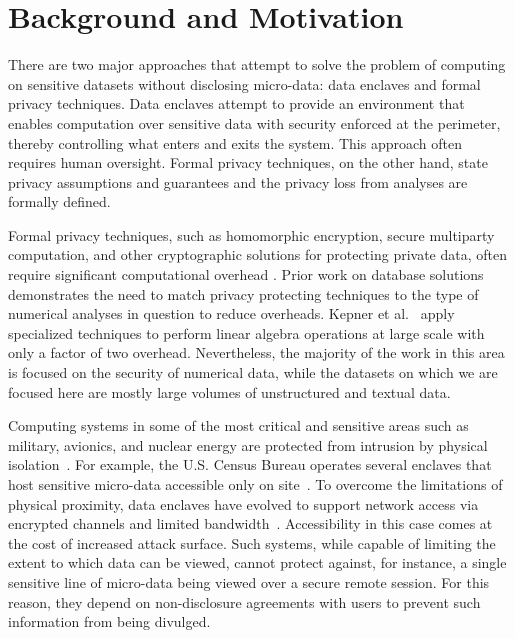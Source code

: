 \section{Background and Motivation} \label{sec:background}

There are two major approaches that attempt to solve the problem of computing on sensitive
datasets without disclosing micro-data: data enclaves and formal privacy techniques. 
Data enclaves attempt to
provide an environment that enables computation over sensitive data with security enforced
at the perimeter, thereby controlling what enters and exits the system. This approach often requires human oversight.
Formal privacy techniques, on the other hand, state privacy assumptions and guarantees and the privacy loss
from analyses are formally defined.

Formal privacy techniques, such as homomorphic encryption, secure multiparty computation, and
other cryptographic solutions for protecting private data, often require significant computational
overhead \cite{gentry2012fully,naehrig2011can}. Prior work on database solutions
\cite{popa2011cryptdb} demonstrates the need to match privacy protecting techniques to the type of
numerical analyses in question to reduce overheads.
Kepner et al.~\cite{kepner2014computing} apply specialized techniques to perform
linear algebra operations at large scale with only a factor of two overhead.
Nevertheless, the majority of the work in this area is focused on the security of numerical data, while the datasets on which we are focused here 
are mostly large volumes of unstructured and textual data.

Computing systems in some of the most critical and sensitive areas such as military, avionics,
and nuclear energy are protected from intrusion by physical isolation~\cite{byres2013air, ross2013security}.
For example, the U.S. Census Bureau operates several enclaves that host sensitive micro-data accessible
only on site~\cite{rdc_uscensus}. To overcome the limitations of physical proximity, data enclaves
have evolved to support network access via encrypted channels and limited bandwidth~\cite{lane2008using, grossman2016toward}.
Accessibility in this case comes at the cost of increased attack surface. Such systems, while
capable of limiting the extent to which data can be viewed, cannot protect against, for instance, a single
sensitive line of micro-data being viewed over a secure remote session. For this reason, they depend on non-disclosure
agreements with users to prevent such information from being divulged.


